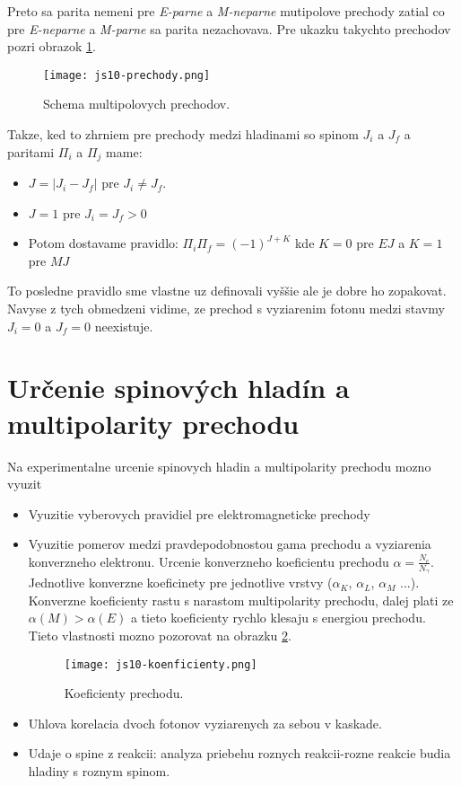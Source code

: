 \documentclass[../../main.tex]{subfiles}
\begin{document}
Preto sa parita nemeni pre \textit{E-parne} a \textit{M-neparne} mutipolove prechody zatial co pre \textit{E-neparne} a \textit{M-parne} sa parita nezachovava. Pre ukazku takychto prechodov pozri obrazok \ref{js10:prechody}.
\begin{figure}[!h]
\centerline{\texttt{[image: js10-prechody.png]}}
\caption{Schema multipolovych prechodov.}
\label{js10:prechody}
\end{figure}
\newline
Takze, ked to zhrniem pre prechody medzi hladinami so spinom $J_i$ a $J_f$ a paritami $\Pi_i$ a $\Pi_j$ mame:
\begin{itemize}
	\item $J=\lvert J_i-J_f \rvert$ pre $J_i \neq J_f$.
	\item $J=1$ pre $J_i=J_f >0$
	\item Potom dostavame pravidlo: $\Pi_i\Pi_f=(-1)^{J+K}$ kde $K=0$ pre $EJ$ a $K=1$ pre $MJ$
\end{itemize}
To posledne pravidlo sme vlastne uz definovali vyššie ale je dobre ho zopakovat. Navyse z tych obmedzeni vidime, ze prechod s vyziarenim fotonu medzi stavmy $J_i=0$ a $J_f=0$ neexistuje.
\section{Určenie spinových hladín a multipolarity prechodu}
Na experimentalne urcenie spinovych hladin a multipolarity prechodu mozno vyuzit 
\begin{itemize}
	\item Vyuzitie vyberovych pravidiel pre elektromagneticke prechody
	\item Vyuzitie pomerov medzi pravdepodobnostou gama prechodu a vyziarenia konverzneho elektronu. Urcenie konverzneho koeficientu prechodu $\alpha=\frac{N_e}{N_{\gamma}}$. Jednotlive konverzne koeficinety pre jednotlive vrstvy ($\alpha_K$, $\alpha_L$, $\alpha_M$ ...). Konverzne koeficienty rastu s narastom multipolarity prechodu, dalej plati ze $\alpha(M)>\alpha(E)$ a tieto koeficienty rychlo klesaju s energiou prechodu. Tieto vlastnosti mozno pozorovat na obrazku \ref{js10:koef}.
	\begin{figure}[!h]
	\centerline{\texttt{[image: js10-koenficienty.png]}}
	\caption{Koeficienty prechodu.}
	\label{js10:koef}
	\end{figure}
	\item Uhlova korelacia dvoch fotonov vyziarenych za sebou v kaskade.
	\item Udaje o spine z reakcii: analyza priebehu roznych reakcii-rozne reakcie budia hladiny s roznym spinom.
\end{itemize}
\end{document}
